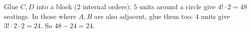 Glue $C,D$ into a block (2 internal orders): $5$ units around a circle give $4!\cdot2=48$ seatings. In those where $A,B$ are also adjacent, glue them too: $4$ units give $3!\cdot2\cdot2=24$. So $48-24=\boxed{24}$.
